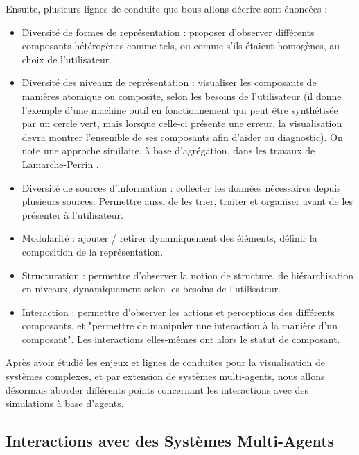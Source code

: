 		Ensuite, plusieurs lignes de conduite que bous allons décrire sont énoncées :
		\begin{itemize}
			\item Diversité de formes de représentation : proposer d'observer différents composants hétérogènes comme tels, ou comme s'ils étaient homogènes, au choix de l'utilisateur.
			\item Diversité des niveaux de représentation : visualiser les composants de manières atomique ou composite, selon les besoins de l'utilisateur (il donne l'exemple d'une machine outil en fonctionnement qui peut être synthétisée par un cercle vert, mais lorsque celle-ci présente une erreur, la visualisation devra montrer l'ensemble de ses composants afin d'aider au diagnostic). On note une approche similaire, à base d'agrégation, dans les travaux de Lamarche-Perrin \cite{lamarche-perrin_analyse_2013}.
			\item Diversité de sources d'information : collecter les données nécessaires depuis plusieurs sources. Permettre aussi de les trier, traiter et organiser avant de les présenter à l'utilisateur.
			\item Modularité : ajouter / retirer dynamiquement des éléments, définir la composition de la représentation.
			\item Structuration : permettre d'observer la notion de structure, de hiérarchisation en niveaux, dynamiquement selon les besoins de l'utilisateur.
			\item Interaction : permettre d'observer les actions et perceptions des différents composants, et "permettre de manipuler une interaction à la manière d'un composant". Les interactions elles-mêmes ont alors le statut de composant.
		\end{itemize}
		
		Après avoir étudié les enjeux et lignes de conduites pour la visualisation de systèmes complexes, et par extension de systèmes multi-agents, nous allons désormais aborder différents points concernant les interactions avec des simulations à base d'agents.
		
		\subsection{Interactions avec des Systèmes Multi-Agents}
	
